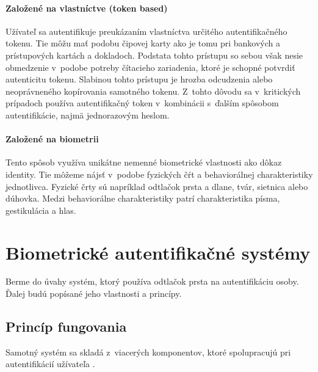 \paragraph{Založené na vlastníctve (token based)}
Užívateľ sa autentifikuje preukázaním vlastníctva určitého autentifikačného tokenu. Tie môžu mať podobu čipovej karty ako je tomu pri bankových a prístupových kartách a dokladoch. Podstata tohto prístupu so sebou však nesie obmedzenie v~podobe potreby čítacieho zariadenia, ktoré je schopné potvrdiť autenticitu tokenu. Slabinou tohto prístupu je hrozba odcudzenia alebo neoprávneného kopírovania samotného tokenu. Z~tohto dôvodu sa v~kritických prípadoch používa autentifikačný token v~kombinácii s~ďalším spôsobom autentifikácie, najmä jednorazovým heslom.

\paragraph{Založené na biometrii}
Tento spôsob využíva unikátne nemenné biometrické vlastnosti ako dôkaz identity. Tie môžeme nájsť v~podobe fyzických čŕt a behaviorálnej charakteristiky jednotlivca. Fyzické črty sú napríklad odtlačok prsta a dlane, tvár, sietnica alebo dúhovka. Medzi behaviorálne charakteristiky patrí charakteristika písma, gestikulácia a hlas.

\section{Biometrické autentifikačné systémy}
Berme do úvahy systém, ktorý používa odtlačok prsta na autentifikáciu osoby. Ďalej budú popísané jeho vlastnosti a princípy.

\subsection{Princíp fungovania}
Samotný systém sa skladá z~viacerých komponentov, ktoré spolupracujú pri autentifikácií užívateľa \cite{biometric_systems_principle}.

